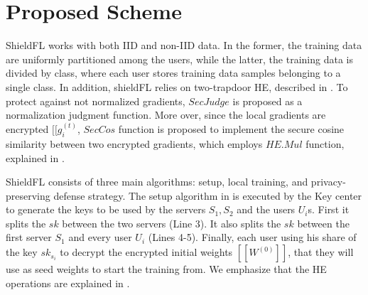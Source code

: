 \section{Proposed Scheme}
\label{sec:proposed-scheme}


ShieldFL works with both IID and non-IID data.
In the former, the training data are uniformly partitioned among the users, while the latter, the training data is divided by class, where each user stores training data samples belonging to a single class.
In addition, shieldFL relies on two-trapdoor HE, described in .
To protect against not normalized gradients, $SecJudge$ is proposed as a normalization judgment function.
More over, since the local gradients are encrypted $[[g_i^{(t)}$, $SecCos$ function is proposed to implement the secure cosine similarity between two encrypted gradients, which employs $HE.Mul$ function, explained in .


ShieldFL consists of three main algorithms: setup, local training, and privacy-preserving defense strategy.
The setup algorithm in  is executed by the Key center to generate the keys to be used by the servers $S_1, S_2$ and the users $U_i$s.
First it splits the $sk$ between the two servers (Line 3).
It also splits the $sk$ between the first server $S_1$ and every user $U_i$ (Lines 4-5).
Finally, each user using his share of the key $sk_{s_i}$ to decrypt the encrypted initial weights $[[W^{(0)}]]$, that they will use as seed weights to start the training from.
We emphasize that the HE operations are explained in .


